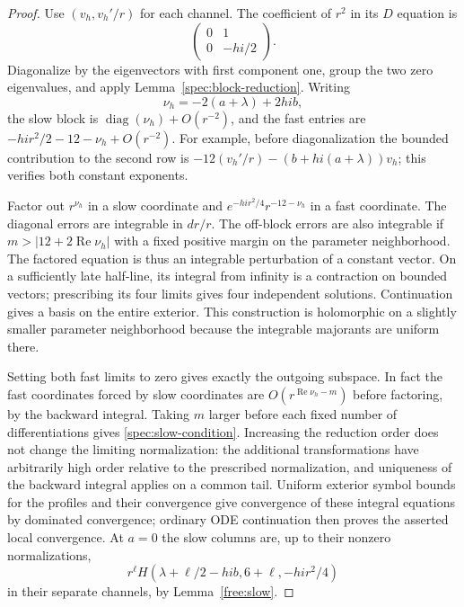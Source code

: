 \begin{proof}
Use $(v_h,v_h'/r)$ for each channel. The coefficient of $r^2$ in its
$D$ equation is
\[
 \begin{pmatrix}0&1\\0&-hi/2\end{pmatrix}.
\]
Diagonalize by the eigenvectors with first component one, group the
two zero eigenvalues, and apply Lemma~\ref{spec:block-reduction}.
Writing
\[
 \nu_h=-2(a+\lambda)+2hib,
\]
the slow block is $\operatorname{diag}(\nu_h)+O(r^{-2})$, and the fast
entries are $-hi r^2/2-12-\nu_h+O(r^{-2})$.
For example, before diagonalization the bounded contribution to the
second row is $-12(v_h'/r)-(b+hi(a+\lambda))v_h$; this verifies both
constant exponents.

Factor out $r^{\nu_h}$ in a slow coordinate and
$e^{-hi r^2/4}r^{-12-\nu_h}$ in a fast coordinate. The diagonal errors
are integrable in $d r/r$. The off-block errors are also integrable if
$m>|12+2\operatorname{Re}\nu_h|$ with a fixed positive margin on the
parameter neighborhood. The factored equation is thus an integrable
perturbation of a constant vector. On a sufficiently late half-line,
its integral from infinity is a contraction on bounded vectors;
prescribing its four limits gives four independent solutions.
Continuation gives a basis on the entire exterior. This construction
is holomorphic on a slightly smaller parameter neighborhood because
the integrable majorants are uniform there.

Setting both fast limits to zero gives exactly the outgoing subspace.
In fact the fast coordinates forced by slow coordinates are
$O(r^{\operatorname{Re}\nu_h-m})$ before factoring, by the backward
integral. Taking $m$ larger before each fixed number of differentiations
gives \eqref{spec:slow-condition}. Increasing the reduction order does
not change the limiting normalization: the additional transformations
have arbitrarily high order relative to the prescribed normalization,
and uniqueness of the backward integral applies on a common tail.
Uniform exterior symbol bounds for the profiles and their convergence
give convergence of these integral equations by dominated convergence;
ordinary ODE continuation then proves the asserted local convergence.
At $a=0$ the slow columns are, up to their nonzero normalizations,
\begin{equation}\label{spec:free-bases}
 r^\ell H(\lambda+\ell/2-hib,6+\ell,-hi r^2/4)
\end{equation}
in their separate channels, by Lemma~\ref{free:slow}.


\end{proof}
